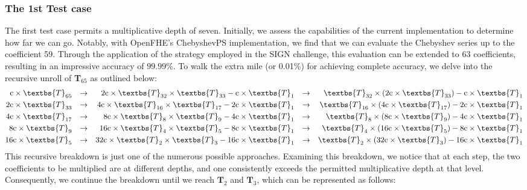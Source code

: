 \documentclass[journal=tosc,final]{iacrtrans}
\begin{document}
 \subsubsection{The 1st Test case}
The first test case permits a multiplicative depth of seven. Initially, we assess the capabilities of the current implementation to determine how far we can go. Notably, with OpenFHE's ChebyshevPS implementation, we find that we can evaluate the Chebyshev series up to the coefficient 59. Through the application of the strategy employed in the SIGN challenge, this evaluation can be extended to 63 coefficients, resulting in an impressive accuracy of $99.99\%$. To walk the extra mile (or 0.01\%) for achieving complete accuracy, we delve into the recursive unroll of \textbf{T}$_{65}$ as outlined below:
 \begin{align}
    \text{c}\times\textbs{T}_{65} && \rightarrow && \text{2c}\times\textbs{T}_{32}\times\textbs{T}_{33}-\text{c}\times\textbs{T}_{1} && \rightarrow &&  \textbs{T}_{32}\times(\text{2c}\times\textbs{T}_{33})-\text{c}\times\textbs{T}_{1}\\
    \text{2c}\times\textbs{T}_{33} && \rightarrow &&  \text{4c}\times\textbs{T}_{16}\times\textbs{T}_{17}-\text{2c}\times\textbs{T}_{1} && \rightarrow  && \textbs{T}_{16}\times(\text{4c}\times\textbs{T}_{17})-\text{2c}\times\textbs{T}_{1}\\
    \text{4c}\times\textbs{T}_{17} && \rightarrow  && \text{8c}\times\textbs{T}_{8}\times\textbs{T}_{9}-\text{4c}\times\textbs{T}_{1} && \rightarrow &&  \textbs{T}_{8}\times(\text{8c}\times\textbs{T}_{9})-\text{4c}\times\textbs{T}_{1}\\
    \text{8c}\times\textbs{T}_{9} && \rightarrow &&  \text{16c}\times\textbs{T}_{4}\times\textbs{T}_{5}-\text{8c}\times\textbs{T}_{1} && \rightarrow &&  \textbs{T}_{4}\times(\text{16c}\times\textbs{T}_{5})-\text{8c}\times\textbs{T}_{1}\\
    \text{16c}\times\textbs{T}_{5} && \rightarrow &&  \text{32c}\times\textbs{T}_{2}\times\textbs{T}_{3}-\text{16c}\times\textbs{T}_{1} && \rightarrow &&  \textbs{T}_{2}\times(\text{32c}\times\textbs{T}_{3})-\text{16c}\times\textbs{T}_{1}
\end{align}
This recursive breakdown is just one of the numerous possible approaches. Examining this breakdown, we notice that at each step, the two coefficients to be multiplied are at different depths, and one consistently exceeds the permitted multiplicative depth at that level. Consequently, we continue the breakdown until we reach $\textbf{T}_2$ and $\textbf{T}_3$, which can be represented as follows:
\end{document}
